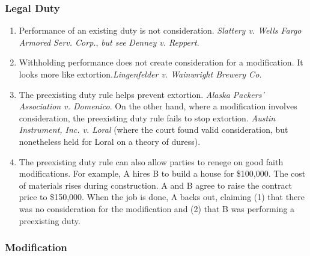 \subsubsection{Legal Duty}

\begin{enumerate}
    \item Performance of an existing duty is not consideration. \emph{Slattery 
    v. Wells Fargo Armored Serv. Corp.}, \emph{but see} \emph{Denney v. 
    Reppert}.
    \item Withholding performance does not create consideration for a 
    modification. It looks more like extortion.\emph{Lingenfelder v. 
    Wainwright Brewery Co.}
    \item The preexisting duty rule helps prevent extortion. \emph{Alaska 
    Packers' Association v. Domenico}. On the other hand, where a modification 
    involves consideration, the preexisting duty rule fails to stop extortion. 
    \emph{Austin Instrument, Inc. v. Loral} (where the court found valid 
    consideration, but nonetheless held for Loral on a theory of duress).
    \item The preexisting duty rule can also allow parties to renege on good 
    faith modifications. For example, A hires B to build a house for 
    \$100,000. The cost of materials rises during construction. A and B agree 
    to raise the contract price to \$150,000. When the job is done, A backs 
    out, claiming (1) that there was no consideration for the modification and 
    (2) that B was performing a preexisting duty.
\end{enumerate}

\subsubsection{Modification}

